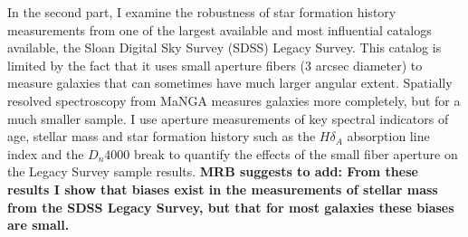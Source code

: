 In the second part, I examine the robustness of star formation history measurements from one of the largest available and most influential catalogs available, the Sloan Digital Sky Survey (SDSS) Legacy Survey. This catalog is limited by the fact that it uses small aperture fibers ($3$ arcsec diameter) to measure galaxies that can sometimes have much larger angular extent. Spatially resolved spectroscopy from MaNGA measures galaxies more completely, but for a much smaller sample. I use aperture measurements of key spectral indicators of age, stellar mass and star formation history such as the $H \delta_{A}$ absorption line index and the $D_{n}4000$ break to quantify the effects of the small fiber aperture on the Legacy Survey sample results. {\bf MRB suggests to add: From these results I show that biases 
exist in the measurements of stellar mass from the SDSS
Legacy Survey, but that for most galaxies these biases 
are small.}\\